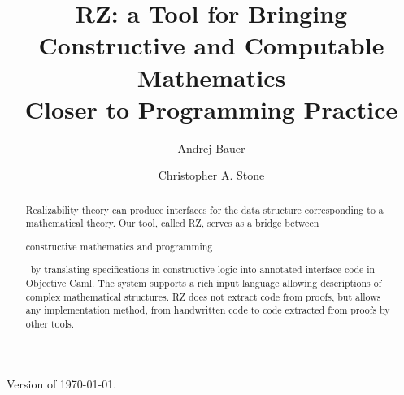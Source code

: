 \documentclass{llncs}
\newif\iflong
\begin{document}
\title{RZ: a Tool for Bringing\\
  Constructive and Computable Mathematics\\
  Closer to Programming Practice}
\author{
  Andrej Bauer \and
  Christopher A. Stone}

\maketitle

\begin{abstract}
  Realizability theory 
\iflong 
  is not only a fundamental tool in logic
  and computability, but also 
  has direct application to the design and
  implementation of programs: it
\fi %
  can produce interfaces for the data
  structure corresponding to a
  mathematical theory.
%
  Our tool, called RZ,
  serves as a bridge between
\iflong the worlds of \fi
  constructive
  mathematics and programming%
\iflong 
.
By using the realizability
  interpretation of constructive mathematics, RZ 
  translates
\else
\ by translating
\fi %
  specifications in constructive logic into annotated
  interface code in Objective Caml.
%
  The system supports
  a rich input language allowing descriptions of
  complex mathematical structures. RZ does not extract code from
  proofs, but allows any implementation method, from handwritten code to code extracted from
  proofs by other tools.
\end{abstract}

\begin{center}
  Version of \today.
\end{center}











{

}

\iflong
\appendix

\fi %
\end{document}

